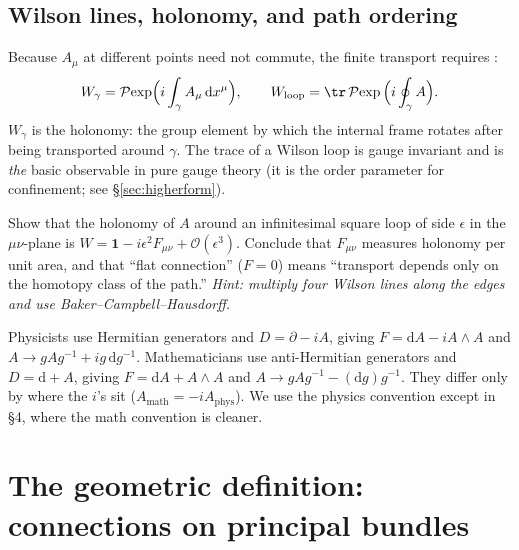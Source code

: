 \documentclass[11pt]{article}
\newcommand{\dd}{\mathrm{d}}                 %
\newcommand{\Pexp}{\mathcal{P}\!\exp}        %
\begin{document}
\subsection{Wilson lines, holonomy, and path ordering}

Because $A_\mu$ at different points need not commute, the finite transport requires
:
\[
W_\gamma = \Pexp\!\Big(i\int_\gamma A_\mu\,\dd x^\mu\Big),
\qquad
W_{\text{loop}} = \tr\, \Pexp\Big(i\oint_\gamma A\Big).
\]
$W_\gamma$ is the holonomy: the group element by which the internal frame rotates after
being transported around $\gamma$. The trace of a Wilson loop is gauge invariant and is
\emph{the} basic observable in pure gauge theory (it is the order parameter for
confinement; see \S\ref{sec:higherform}).

\begin{xca}
Show that the holonomy of $A$ around an infinitesimal square loop of side $\epsilon$ in
the $\mu\nu$-plane is $W = \mathbf{1} - i\epsilon^2 F_{\mu\nu} + \mathcal{O}(\epsilon^3)$.
Conclude that $F_{\mu\nu}$ measures holonomy per unit area, and that ``flat connection''
($F=0$) means ``transport depends only on the homotopy class of the path.'' \emph{Hint:
multiply four Wilson lines along the edges and use Baker--Campbell--Hausdorff.}
\end{xca}

\begin{nnote}
Physicists use Hermitian generators and $D=\partial - iA$, giving $F=\dd A - iA\wedge A$
and $A\to gAg^{-1}+ig\,\dd g^{-1}$. Mathematicians use anti-Hermitian generators and
$D=\dd + A$, giving $F=\dd A + A\wedge A$ and $A\to gAg^{-1}-(\dd g)g^{-1}$. They differ
only by where the $i$'s sit ($A_{\text{math}} = -iA_{\text{phys}}$). We use the physics
convention except in \S4, where the math convention is cleaner.
\end{nnote}

\section{The geometric definition: connections on principal bundles}
\label{sec:bundles}
\end{document}
